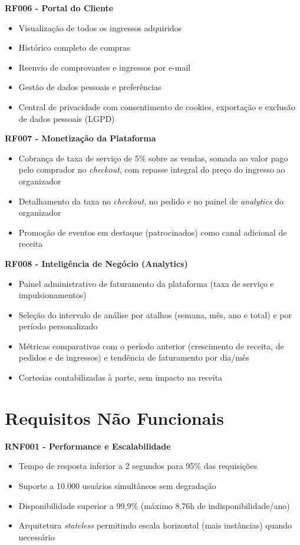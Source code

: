 \textbf{RF006 - Portal do Cliente}
\begin{itemize}
    \item Visualização de todos os ingressos adquiridos
    \item Histórico completo de compras
    \item Reenvio de comprovantes e ingressos por e-mail
    \item Gestão de dados pessoais e preferências
    \item Central de privacidade com consentimento de cookies, exportação e exclusão de dados pessoais (LGPD)
\end{itemize}

\textbf{RF007 - Monetização da Plataforma}
\begin{itemize}
    \item Cobrança de taxa de serviço de 5\% sobre as vendas, somada ao valor pago pelo comprador no \textit{checkout}, com repasse integral do preço do ingresso ao organizador
    \item Detalhamento da taxa no \textit{checkout}, no pedido e no painel de \textit{analytics} do organizador
    \item Promoção de eventos em destaque (patrocinados) como canal adicional de receita
\end{itemize}

\textbf{RF008 - Inteligência de Negócio (Analytics)}
\begin{itemize}
    \item Painel administrativo de faturamento da plataforma (taxa de serviço e impulsionamentos)
    \item Seleção do intervalo de análise por atalhos (semana, mês, ano e total) e por período personalizado
    \item Métricas comparativas com o período anterior (crescimento de receita, de pedidos e de ingressos) e tendência de faturamento por dia/mês
    \item Cortesias contabilizadas à parte, sem impacto na receita
\end{itemize}

\section{Requisitos Não Funcionais}

\textbf{RNF001 - Performance e Escalabilidade}
\begin{itemize}
    \item Tempo de resposta inferior a 2 segundos para 95\% das requisições
    \item Suporte a 10.000 usuários simultâneos sem degradação
    \item Disponibilidade superior a 99,9\% (máximo 8,76h de indisponibilidade/ano)
    \item Arquitetura \textit{stateless} permitindo escala horizontal (mais instâncias) quando necessário
\end{itemize}

